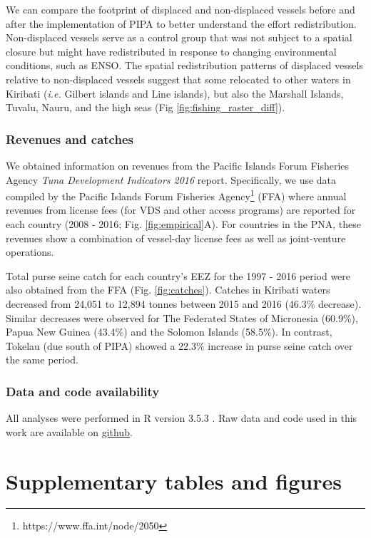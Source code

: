 \documentclass[12pt]{article}
\begin{document}
We can compare the footprint of displaced and non-displaced vessels before and after the implementation of PIPA to better understand the effort redistribution. Non-displaced vessels serve as a control group that was not subject to a spatial closure but might have redistributed in response to changing environmental conditions, such as ENSO. The spatial redistribution patterns of displaced vessels relative to non-displaced vessels suggest that some relocated to other waters in Kiribati (\emph{i.e.} Gilbert islands and Line islands), but also the Marshall Islands, Tuvalu, Nauru, and the high seas (Fig \ref{fig:fishing_raster_diff}).


\subsubsection{Revenues and catches}

We obtained information on revenues from the Pacific Islands Forum Fisheries Agency \emph{Tuna Development Indicators 2016} report.  Specifically, we use data compiled by the Pacific Islands Forum Fisheries Agency\footnote{https://www.ffa.int/node/2050} (FFA) where annual revenues from license fees (for VDS and other access programs) are reported for each country (2008 - 2016; Fig. \ref{fig:empirical}A). For countries in the PNA, these revenues show a combination of vessel-day license fees as well as joint-venture operations.

Total purse seine catch for each country's EEZ for the 1997 - 2016 period were also obtained from the FFA (Fig. \ref{fig:catches}). Catches in Kiribati waters decreased from 24,051 to 12,894 tonnes between 2015 and 2016 (46.3\% decrease). Similar decreases were observed for The Federated States of Micronesia (60.9\%), Papua New Guinea (43.4\%) and the Solomon Islands (58.5\%). In contrast, Tokelau (due south of PIPA) showed a 22.3\% increase in purse seine catch over the same period.

\subsubsection{Data and code availability}

All analyses were performed in R version 3.5.3 \cite{rcore_2018}. Raw data and code used in this work are available on \href{https://github.com/jcvdav/MPA_displacement}{github}.

\clearpage

\FloatBarrier

\section{Supplementary tables and figures}
\end{document}
